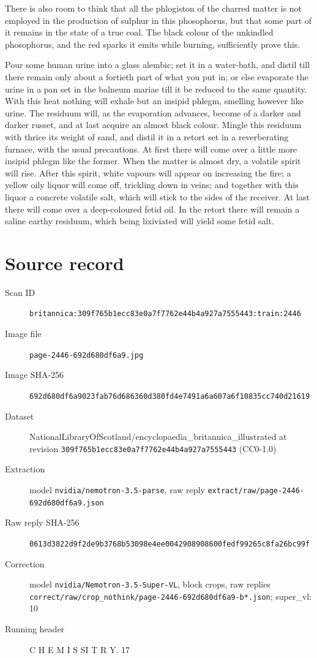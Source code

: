\documentclass{article}
\begin{document}
There is also room to think that all the phlogiston of the charred matter is not employed in the production of sulphur in this phosophorus, but that some part of it remains in the state of a true coal. The black colour of the unkindled phosophorus, and the red sparks it emits while burning, sufficiently prove this.

Pour some human urine into a glass alembic; set it in a water-bath, and distil till there remain only about a fortieth part of what you put in; or else evaporate the urine in a pan set in the balneum mariae till it be reduced to the same quantity. With this heat nothing will exhale but an insipid phlegm, smelling however like urine. The residuum will, as the evaporation advances, become of a darker and darker russet, and at last acquire an almost black colour. Mingle this residuum with thrice its weight of sand, and distil it in a retort set in a reverberating furnace, with the usual precautions. At first there will come over a little more insipid phlegm like the former. When the matter is almost dry, a volatile spirit will rise. After this spirit, white vapours will appear on increasing the fire; a yellow oily liquor will come off, trickling down in veins; and together with this liquor a concrete volatile salt, which will stick to the sides of the receiver. At last there will come over a deep-coloured fetid oil. In the retort there will remain a saline earthy residuum, which being lixiviated will yield some fetid salt.


\section*{Source record}
\begin{description}
\item[Scan ID] \texttt{britannica:309f765b1ecc83e0a7f7762e44b4a927a7555443:train:2446}
\item[Image file] \texttt{page-2446-692d680df6a9.jpg}
\item[Image SHA-256] \texttt{692d680df6a9023fab76d686360d380fd4e7491a6a607a6f10835cc740d21619}
\item[Dataset] NationalLibraryOfScotland/encyclopaedia\_britannica\_illustrated at revision \texttt{309f765b1ecc83e0a7f7762e44b4a927a7555443} (CC0-1.0)
\item[Extraction] model \texttt{nvidia/nemotron-3.5-parse}, raw reply \texttt{extract/raw/page-2446-692d680df6a9.json}
\item[Raw reply SHA-256] \texttt{0613d3822d9f2de9b3768b53098e4ee0042908908600fedf99265c8fa26bc99f}
\item[Correction] model \texttt{nvidia/Nemotron-3.5-Super-VL}, block crops, raw replies \texttt{correct/raw/crop\_nothink/page-2446-692d680df6a9-b*.json}; super\_vl: 10
\item[Running header] C H E M I S SI T R Y. 17
\end{description}
\end{document}
